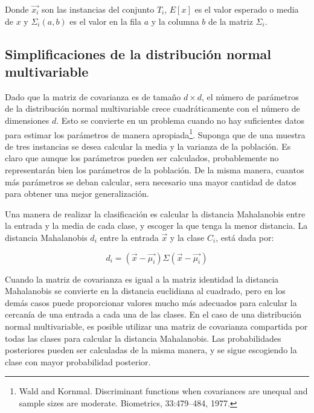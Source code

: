 \documentclass[a4paper, 11pt, oneside]{report}
\begin{document}
Donde $\vec{x_i}$ son las instancias del conjunto $T_i$, $E[x]$ es el valor esperado o media de $x$ y $\Sigma_i(a,b)$ es el valor en la fila $a$ y la columna $b$ de la matriz $\Sigma_i$.

\subsection{Simplificaciones de la distribución normal multivariable}

Dado que la matriz de covarianza es de tamaño $d \times d$, el número de parámetros de la distribución normal multivariable crece cuadráticamente con el número de dimensiones $d$. Esto se convierte en un problema cuando no hay suficientes datos para estimar los parámetros de manera apropiada\footnote{Wald and Kornmal. Discriminant functions when covariances are unequal and sample sizes are moderate. Biometrics, 33:479–484, 1977.}. Suponga que de una muestra de tres instancias se desea calcular la media y la varianza de la población. Es claro que aunque los parámetros pueden ser calculados, probablemente no representarán bien los parámetros de la población. De la misma manera, cuantos más parámetros se deban calcular, sera necesario una mayor cantidad de datos para obtener una mejor generalización.

Una manera de realizar la clasificación es calcular la distancia Mahalanobis entre la entrada y la media de cada clase, y escoger la que tenga la menor distancia. La distancia Mahalanobis $d_i$ entre la entrada $\vec{x}$ y la clase $C_i$, está dada por:

	\begin{equation}
		\label{eq:mahalanobis}
		d_i = (\vec{x}-\vec{\mu_i})\Sigma(\vec{x}-\vec{\mu_i}) 
	\end{equation}

Cuando la matriz de covarianza es igual a la matriz identidad la distancia Mahalanobis se convierte en la distancia euclidiana al cuadrado, pero en los demás casos puede proporcionar valores mucho más adecuados para calcular la cercanía de una entrada a cada una de las clases. En el caso de una distribución normal multivariable, es posible utilizar una matriz de covarianza compartida por todas las clases para calcular la distancia Mahalanobis. Las probabilidades posteriores pueden ser calculadas de la misma manera, y se sigue escogiendo la clase con mayor probabilidad posterior.

\end{document}
